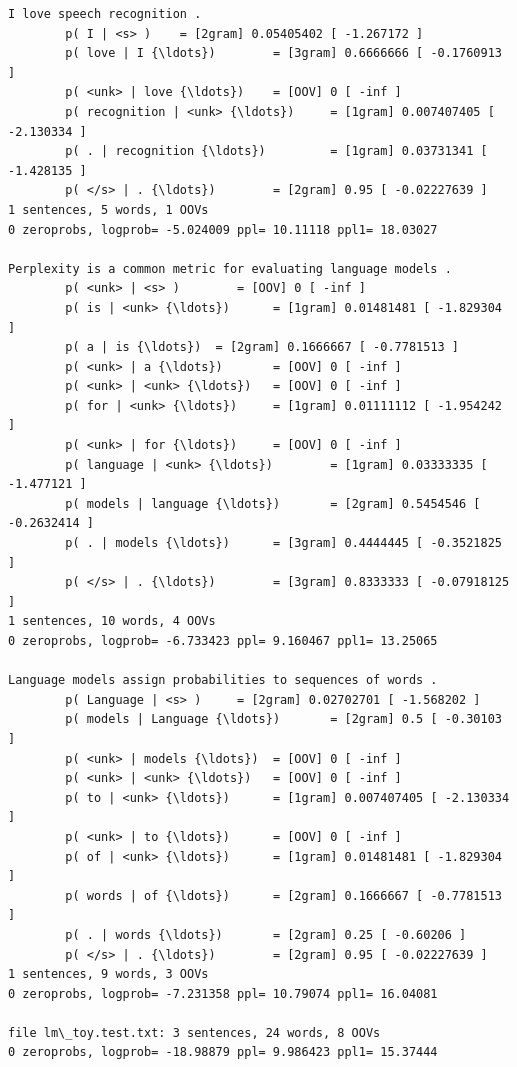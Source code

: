 \documentclass[11pt]{article}
\begin{document}
    \begin{Verbatim}[commandchars=\\\{\}]
I love speech recognition .
        p( I | <s> )    = [2gram] 0.05405402 [ -1.267172 ]
        p( love | I {\ldots})        = [3gram] 0.6666666 [ -0.1760913 ]
        p( <unk> | love {\ldots})    = [OOV] 0 [ -inf ]
        p( recognition | <unk> {\ldots})     = [1gram] 0.007407405 [ -2.130334 ]
        p( . | recognition {\ldots})         = [1gram] 0.03731341 [ -1.428135 ]
        p( </s> | . {\ldots})        = [2gram] 0.95 [ -0.02227639 ]
1 sentences, 5 words, 1 OOVs
0 zeroprobs, logprob= -5.024009 ppl= 10.11118 ppl1= 18.03027

Perplexity is a common metric for evaluating language models .
        p( <unk> | <s> )        = [OOV] 0 [ -inf ]
        p( is | <unk> {\ldots})      = [1gram] 0.01481481 [ -1.829304 ]
        p( a | is {\ldots})  = [2gram] 0.1666667 [ -0.7781513 ]
        p( <unk> | a {\ldots})       = [OOV] 0 [ -inf ]
        p( <unk> | <unk> {\ldots})   = [OOV] 0 [ -inf ]
        p( for | <unk> {\ldots})     = [1gram] 0.01111112 [ -1.954242 ]
        p( <unk> | for {\ldots})     = [OOV] 0 [ -inf ]
        p( language | <unk> {\ldots})        = [1gram] 0.03333335 [ -1.477121 ]
        p( models | language {\ldots})       = [2gram] 0.5454546 [ -0.2632414 ]
        p( . | models {\ldots})      = [3gram] 0.4444445 [ -0.3521825 ]
        p( </s> | . {\ldots})        = [3gram] 0.8333333 [ -0.07918125 ]
1 sentences, 10 words, 4 OOVs
0 zeroprobs, logprob= -6.733423 ppl= 9.160467 ppl1= 13.25065

Language models assign probabilities to sequences of words .
        p( Language | <s> )     = [2gram] 0.02702701 [ -1.568202 ]
        p( models | Language {\ldots})       = [2gram] 0.5 [ -0.30103 ]
        p( <unk> | models {\ldots})  = [OOV] 0 [ -inf ]
        p( <unk> | <unk> {\ldots})   = [OOV] 0 [ -inf ]
        p( to | <unk> {\ldots})      = [1gram] 0.007407405 [ -2.130334 ]
        p( <unk> | to {\ldots})      = [OOV] 0 [ -inf ]
        p( of | <unk> {\ldots})      = [1gram] 0.01481481 [ -1.829304 ]
        p( words | of {\ldots})      = [2gram] 0.1666667 [ -0.7781513 ]
        p( . | words {\ldots})       = [2gram] 0.25 [ -0.60206 ]
        p( </s> | . {\ldots})        = [2gram] 0.95 [ -0.02227639 ]
1 sentences, 9 words, 3 OOVs
0 zeroprobs, logprob= -7.231358 ppl= 10.79074 ppl1= 16.04081

file lm\_toy.test.txt: 3 sentences, 24 words, 8 OOVs
0 zeroprobs, logprob= -18.98879 ppl= 9.986423 ppl1= 15.37444
    \end{Verbatim}
\end{document}

